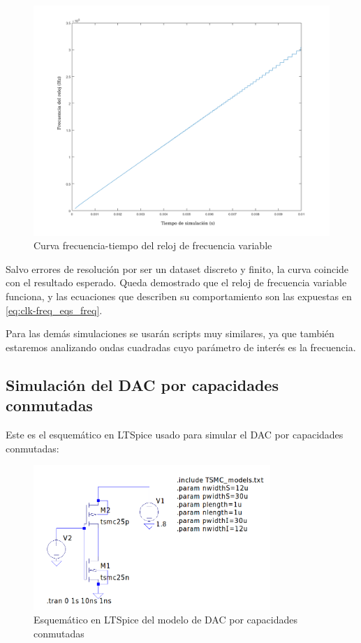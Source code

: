 \documentclass[12pt]{report} %
\begin{document}
	\begin{figure}[H]
		\centerline{\includegraphics[width=1.1\textwidth]{ml-clk-freq-curve.png}}
		\caption[Curva frecuencia-tiempo del reloj de frecuencia variable]{Curva frecuencia-tiempo del reloj de frecuencia variable}
		\label{fig:ml-clk-freq-curve.png}
	\end{figure}

	Salvo errores de resolución por ser un dataset discreto y finito, la curva coincide con el resultado esperado. Queda demostrado que el reloj de frecuencia variable funciona, y las ecuaciones que describen su comportamiento son las expuestas en \ref{eq:clk-freq_eqs_freq}.
	
	Para las demás simulaciones se usarán scripts muy similares, ya que también estaremos analizando ondas cuadradas cuyo parámetro de interés es la frecuencia.	


	\subsection{Simulación del DAC por capacidades conmutadas}
	
	Este es el esquemático en LTSpice usado para simular el DAC por capacidades conmutadas:
	
	\begin{figure}[H]
		\includegraphics[width=0.8\textwidth]{ltspice-sw-cap-empty.png}
		\caption[Esquemático en LTSpice del modelo de DAC por capacidades conmutadas]{Esquemático en LTSpice del modelo de DAC por capacidades conmutadas}
		\label{fig:ltspice-sw-cap-empty.png}
	\end{figure}
	
\end{document}
